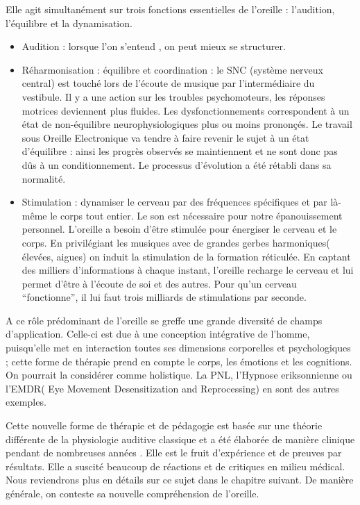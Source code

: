 Elle agit simultanément sur trois fonctions essentielles de l'oreille
: l'audition, l'équilibre et la dynamisation.
\begin{itemize}
\item Audition : lorsque l'on s'entend , on peut mieux se structurer.
\item Réharmonisation : équilibre et coordination : le SNC (système nerveux
central) est touché lors de l'écoute de musique par l'intermédiaire
du vestibule. Il y a une action sur les troubles psychomoteurs, les
réponses motrices deviennent plus fluides. Les dysfonctionnements
correspondent à un état de non-équilibre neurophysiologiques plus
ou moins prononçés. Le travail sous Oreille Electronique va tendre
à faire revenir le sujet à un état d'équilibre : ainsi les progrès
observés se maintiennent et ne sont donc pas dûs à un conditionnement.
Le processus d'évolution a été rétabli dans sa normalité.
\item Stimulation : dynamiser le cerveau par des fréquences spécifiques
et par là-même le corps tout entier. Le son est nécessaire pour notre
épanouissement personnel. L'oreille a besoin d'être stimulée pour
énergiser le cerveau et le corps. En privilégiant les musiques avec
de grandes gerbes harmoniques( élevées, aigues) on induit la stimulation
de la formation réticulée. En captant des milliers d'informations
à chaque instant, l'oreille recharge le cerveau et lui permet d'être
à l'écoute de soi et des autres. Pour qu'un cerveau ``fonctionne'',
il lui faut trois milliards de stimulations par seconde.
\end{itemize}
A ce rôle prédominant de l'oreille se greffe une grande diversité
de champs d'application. Celle-ci est due à une conception intégrative
de l'homme, puisqu'elle met en interaction toutes ses dimensions corporelles
et psychologiques ; cette forme de thérapie prend en compte le corps,
les émotions et les cognitions. On pourrait la considérer comme holistique.
La PNL, l'Hypnose eriksonnienne ou l'EMDR( Eye Movement Desensitization
and Reprocessing) en sont des autres exemples. 

Cette nouvelle forme de thérapie et de pédagogie est basée sur une
théorie différente de la physiologie auditive classique et a été élaborée
de manière clinique pendant de nombreuses années . Elle est le fruit
d'expérience et de preuves par résultats. Elle a suscité beaucoup
de réactions et de critiques en milieu médical. Nous reviendrons plus
en détails sur ce sujet dans le chapitre suivant. De manière générale,
on conteste sa nouvelle compréhension de l'oreille.

